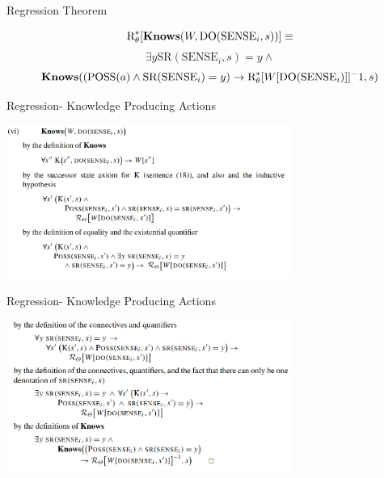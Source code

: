 \begin{frame}{Regression Theorem}

\begin{theorem}

    \[ \text{R}^*_{\theta}[\textbf{Knows}(W, \text{DO}(\text{SENSE}_i, s))] \equiv \]
    \[ \exists y \text{SR}(\text{SENSE}_i, s) = y \land \]       
    \[ \textbf{Knows}((\text{POSS}(a) \land \text{SR}(\text{SENSE}_i) = y) \rightarrow \text{R}^*_{\theta}[W[\text{DO}(\text{SENSE}_i)]]^-1, s) \]
\end{theorem}      
\end{frame}

\begin{frame}{Regression- Knowledge Producing Actions}

    \begin{center}
        \includegraphics[width=0.7\textwidth]{assets/proof1.png}
    \end{center}

\end{frame}

\begin{frame}{Regression- Knowledge Producing Actions}

    \begin{center}
        \includegraphics[width=0.7\textwidth]{assets/proof2.png}
    \end{center}

\end{frame}

